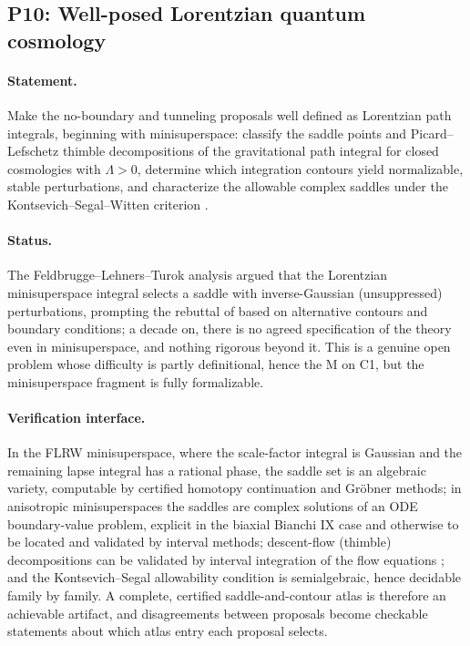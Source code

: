 \documentclass[11pt,letterpaper]{article}
\newcommand{\MM}{M}
\begin{document}
\subsection{P10: Well-posed Lorentzian quantum cosmology}
\label{sec:p10}

\paragraph{Statement.} Make the no-boundary \cite{hartlehawking1983} and tunneling proposals well defined as Lorentzian path integrals, beginning with minisuperspace: classify the saddle points and Picard--Lefschetz thimble decompositions of the gravitational path integral for closed cosmologies with $\Lambda>0$, determine which integration contours yield normalizable, stable perturbations, and characterize the allowable complex saddles under the Kontsevich--Segal--Witten criterion \cite{kontsevichsegal2021,witten2021}.

\paragraph{Status.} The Feldbrugge--Lehners--Turok analysis \cite{flt2017,fltprl2017} argued that the Lorentzian minisuperspace integral selects a saddle with inverse-Gaussian (unsuppressed) perturbations, prompting the rebuttal of \cite{ddhhj2017} based on alternative contours and boundary conditions; a decade on, there is no agreed specification of the theory even in minisuperspace, and nothing rigorous beyond it. This is a genuine open problem whose difficulty is partly definitional, hence the \MM{} on C1, but the minisuperspace fragment is fully formalizable.

\paragraph{Verification interface.} In the FLRW minisuperspace, where the scale-factor integral is Gaussian and the remaining lapse integral has a rational phase, the saddle set is an algebraic variety, computable by certified homotopy continuation and Gr\"obner methods; in anisotropic minisuperspaces the saddles are complex solutions of an ODE boundary-value problem, explicit in the biaxial Bianchi IX case \cite{jhh2019} and otherwise to be located and validated by interval methods; descent-flow (thimble) decompositions can be validated by interval integration of the flow equations \cite{arb2017}; and the Kontsevich--Segal allowability condition is semialgebraic, hence decidable family by family. A complete, certified saddle-and-contour atlas is therefore an achievable artifact, and disagreements between proposals become checkable statements about which atlas entry each proposal selects.
\end{document}
